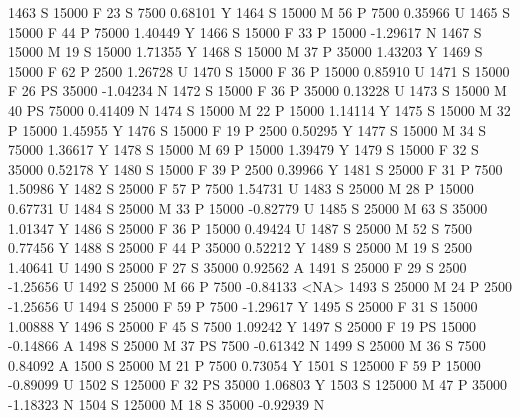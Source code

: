 \documentclass{article}
\begin{document}
\begin{Schunk}
\begin{Soutput}
1463      S      15000   F  23         S   7500   0.68101    Y
1464      S      15000   M  56         P   7500   0.35966    U
1465      S      15000   F  44         P  75000   1.40449    Y
1466      S      15000   F  33         P  15000  -1.29617    N
1467      S      15000   M  19         S  15000   1.71355    Y
1468      S      15000   M  37         P  35000   1.43203    Y
1469      S      15000   F  62         P   2500   1.26728    U
1470      S      15000   F  36         P  15000   0.85910    U
1471      S      15000   F  26        PS  35000  -1.04234    N
1472      S      15000   F  36         P  35000   0.13228    U
1473      S      15000   M  40        PS  75000   0.41409    N
1474      S      15000   M  22         P  15000   1.14114    Y
1475      S      15000   M  32         P  15000   1.45955    Y
1476      S      15000   F  19         P   2500   0.50295    Y
1477      S      15000   M  34         S  75000   1.36617    Y
1478      S      15000   M  69         P  15000   1.39479    Y
1479      S      15000   F  32         S  35000   0.52178    Y
1480      S      15000   F  39         P   2500   0.39966    Y
1481      S      25000   F  31         P   7500   1.50986    Y
1482      S      25000   F  57         P   7500   1.54731    U
1483      S      25000   M  28         P  15000   0.67731    U
1484      S      25000   M  33         P  15000  -0.82779    U
1485      S      25000   M  63         S  35000   1.01347    Y
1486      S      25000   F  36         P  15000   0.49424    U
1487      S      25000   M  52         S   7500   0.77456    Y
1488      S      25000   F  44         P  35000   0.52212    Y
1489      S      25000   M  19         S   2500   1.40641    U
1490      S      25000   F  27         S  35000   0.92562    A
1491      S      25000   F  29         S   2500  -1.25656    U
1492      S      25000   M  66         P   7500  -0.84133 <NA>
1493      S      25000   M  24         P   2500  -1.25656    U
1494      S      25000   F  59         P   7500  -1.29617    Y
1495      S      25000   F  31         S  15000   1.00888    Y
1496      S      25000   F  45         S   7500   1.09242    Y
1497      S      25000   F  19        PS  15000  -0.14866    A
1498      S      25000   M  37        PS   7500  -0.61342    N
1499      S      25000   M  36         S   7500   0.84092    A
1500      S      25000   M  21         P   7500   0.73054    Y
1501      S     125000   F  59         P  15000  -0.89099    U
1502      S     125000   F  32        PS  35000   1.06803    Y
1503      S     125000   M  47         P  35000  -1.18323    N
1504      S     125000   M  18         S  35000  -0.92939    N

\end{Soutput}
\end{Schunk}
\end{document}

